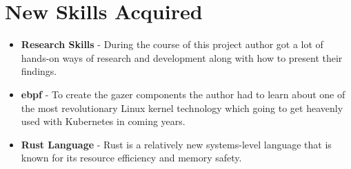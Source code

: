 \section{New Skills Acquired}

\begin{itemize}[noitemsep,nolistsep]
    \item \textbf{Research Skills} - During the course of this project author got a lot of hands-on ways of research and development along with how to present their findings.
    \item \textbf{\ac{ebpf}} - To create the \ac{gazer} components the author had to learn about one of the most revolutionary Linux kernel technology which going to get heavenly used with Kubernetes in coming years.
    \item \textbf{Rust Language} - Rust is a relatively new systems-level language that is known for its resource efficiency and memory safety.
\end{itemize}